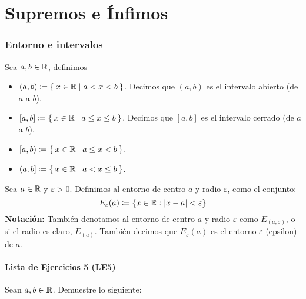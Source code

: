 \part*{Supremos e Ínfimos}

\section*{Entorno e intervalos}

  Sea $a, b\in \mathbb{R}$, definimos
\begin{itemize}
 \item $(a,b)\coloneqq \Set{x\in \mathbb{R}| a<x<b}$. Decimos que $(a,b)$ es el intervalo abierto (de $a$ a $b$).
 \item $[a,b]\coloneqq \Set{x\in \mathbb{R}|a\leq x\leq b}$. Decimos que $[a, b]$ es el intervalo cerrado (de $a$ a $b$).
 \item $[a,b)\coloneqq \Set{x\in \mathbb{R}|a\leq x <b}$.
 \item $(a,b]\coloneqq \Set{x\in \mathbb{R}|a<x\leq b}$.
\end{itemize}

 Sea $a \in \mathbb{R}$ y $\varepsilon>0$. Definimos al entorno de centro $a$ y radio $\varepsilon$, como el conjunto: \[E_\varepsilon(a)\coloneqq \{ x\in \mathbb{R}: |x-a|<\varepsilon\}\]
\textbf{Notación:} También denotamos al entorno de centro $a$ y radio $\varepsilon$ como $E_{(a, \varepsilon)}$, o si el radio es claro, $E_{(a)}$. También decimos que $E_\varepsilon(a)$ es el entorno-$\varepsilon$ (epsilon) de $a$.

\subsection*{Lista de Ejercicios 5 (LE5)}

Sean $a,b \in \mathbb{R}$. Demuestre lo siguiente:


